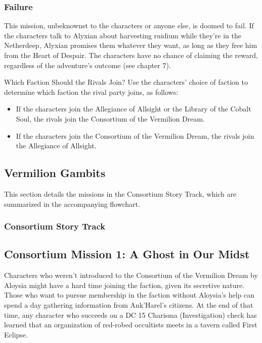 \documentclass[10pt,a4paper,twoside,bg=print,twocolumn,openany,nodeprecatedcode]{dndbook}
\begin{document}
\subsubsection{Failure}
This mission, unbeknownst to the characters or anyone else, is doomed to fail. If the characters talk to Alyxian about harvesting ruidium while they're in the Netherdeep, Alyxian promises them whatever they want, as long as they free him from the Heart of Despair. The characters have no chance of claiming the reward, regardless of the adventure's outcome (see chapter 7).

\begin{DndSidebar}[float=!b]{Which Faction Should the Rivals Join?}
Use the characters' choice of faction to determine which faction the rival party joins, as follows:




\begin{itemize}
\item If the characters join the Allegiance of Allsight or the Library of the Cobalt Soul, the rivals join the Consortium of the Vermilion Dream.
\item If the characters join the Consortium of the Vermilion Dream, the rivals join the Allegiance of Allsight.
\end{itemize}



\end{DndSidebar}

\subsection{Vermilion Gambits}
This section details the missions in the Consortium Story Track, which are summarized in the accompanying flowchart.

\subsubsection{Consortium Story Track}
\subsection{Consortium Mission 1: A Ghost in Our Midst}
Characters who weren't introduced to the Consortium of the Vermilion Dream by Aloysia might have a hard time joining the faction, given its secretive nature. Those who want to pursue membership in the faction without Aloysia's help can spend a day gathering information from Ank'Harel's citizens. At the end of that time, any character who succeeds on a DC 15 Charisma (Investigation) check has learned that an organization of red-robed occultists meets in a tavern called First Eclipse.
\end{document}
